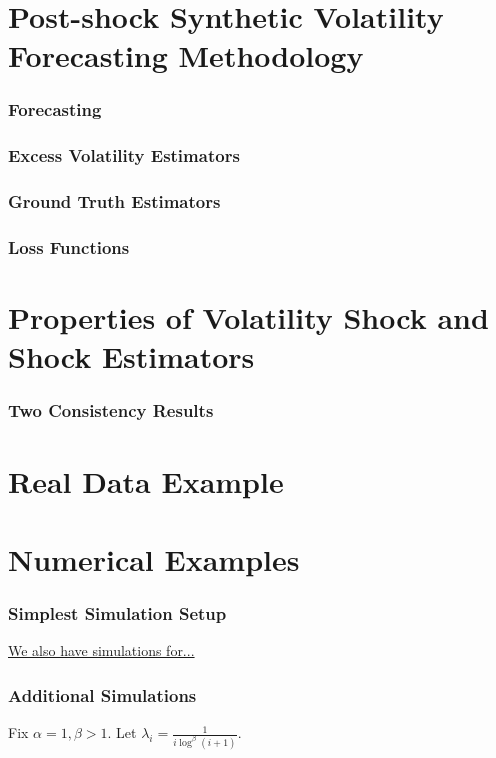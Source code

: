 \documentclass{beamer}
\theoremstyle{definition}
\begin{document}
\section{Post-shock Synthetic Volatility Forecasting Methodology}

\begin{frame}
\frametitle{Forecasting}
\end{frame}

\begin{frame}
\frametitle{Excess Volatility Estimators}
\end{frame}

\begin{frame}

\frametitle{Ground Truth Estimators}

\end{frame}

\begin{frame}

\frametitle{Loss Functions}
\end{frame}

\section{Properties of Volatility Shock and Shock Estimators}
\frametitle{Two Consistency Results}

\section{Real Data Example}

\section{Numerical Examples}

\begin{frame}
\fontsize{8pt}{9pt}

\frametitle{Simplest Simulation Setup}

\hyperlink{first_link_target}{We also have simulations for...}

\end{frame}

\begin{frame}
\frametitle{Additional Simulations}
\label{first_link_target}

\begin{example}
Fix $\alpha = 1, \beta > 1$.  Let $\lambda_{i} = \frac{1}{i \log^{\beta}(i+1)}$.

\end{example}

\end{frame}
\end{document}
